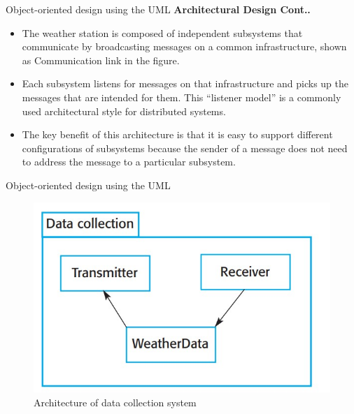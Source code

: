 \documentclass{beamer}
\begin{document}
\begin{frame}{Object-oriented design using the UML}
\textbf{Architectural Design Cont..}
\begin{itemize}
	\item The weather station is composed of independent subsystems that 
	communicate by broadcasting messages on a common infrastructure, 
	shown as Communication link in the figure.
	\item Each subsystem listens for messages on that infrastructure and picks 
	up the messages that are intended for them. This “listener model” is a 
	commonly used architectural style for distributed systems.
	\item The key benefit of this architecture is that it is easy to support 
	different configurations of subsystems because the sender of a 
	message does not need to address the message to a particular 
	subsystem.
\end{itemize}
\end{frame}
\begin{frame}{Object-oriented design using the UML}
	\begin{figure}
		\includegraphics[scale=.5]{img/m3_5}
		\caption{Architecture 
			of data collection 
			system}
	\end{figure}
\end{frame}
\end{document}
